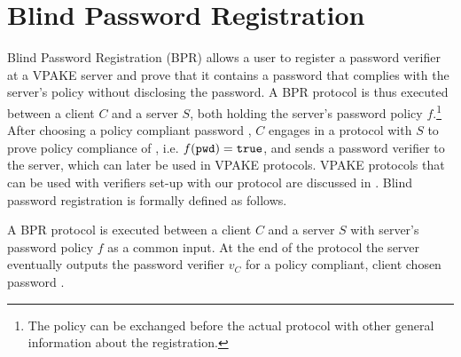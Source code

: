 \section{Blind Password Registration}

Blind Password Registration (BPR) allows a user to register a password verifier at a VPAKE server and prove that it contains a password that complies with the server's policy without disclosing the password.
A BPR protocol is thus executed between a client $C$ and a server $S$, both holding the server's password policy $f$.\footnote{The policy can be exchanged before the actual protocol with other general information about the registration.}
After choosing a policy compliant password \pwd, $C$ engages in a protocol with $S$ to prove policy compliance of \pwd, i.e. $f(\mathtt{pwd})=\mathtt{true}$, and sends a password verifier to the server, which can later be used in VPAKE protocols.
VPAKE protocols that can be used with verifiers set-up with our protocol are discussed in \cite{KieferM14}.
Blind password registration is formally defined as follows.

\begin{definition}\label{def:bpr}
A BPR protocol is executed between a client $C$ and a server $S$ with server's password policy $f$ as a common input. At the end of the protocol the server eventually outputs the password verifier $v_C$ for a policy compliant, client chosen password \pwd. %
\end{definition}

